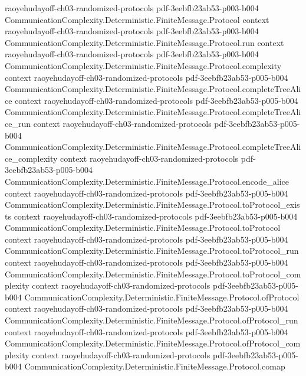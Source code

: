 \begin{theorem}
  {raoyehudayoff-ch03-randomized-protocols}
  {pdf-3eebfb23ab53-p003-b004}
\proofstep
  {CommunicationComplexity.Deterministic.FiniteMessage.Protocol}
  {context}
  {raoyehudayoff-ch03-randomized-protocols}
  {pdf-3eebfb23ab53-p003-b004}
\proofstep
  {CommunicationComplexity.Deterministic.FiniteMessage.Protocol.run}
  {context}
  {raoyehudayoff-ch03-randomized-protocols}
  {pdf-3eebfb23ab53-p003-b004}
\proofstep
  {CommunicationComplexity.Deterministic.FiniteMessage.Protocol.complexity}
  {context}
  {raoyehudayoff-ch03-randomized-protocols}
  {pdf-3eebfb23ab53-p005-b004}
\proofstep
  {CommunicationComplexity.Deterministic.FiniteMessage.Protocol.completeTreeAlice}
  {context}
  {raoyehudayoff-ch03-randomized-protocols}
  {pdf-3eebfb23ab53-p005-b004}
\proofstep
  {CommunicationComplexity.Deterministic.FiniteMessage.Protocol.completeTreeAlice_run}
  {context}
  {raoyehudayoff-ch03-randomized-protocols}
  {pdf-3eebfb23ab53-p005-b004}
\proofstep
  {CommunicationComplexity.Deterministic.FiniteMessage.Protocol.completeTreeAlice_complexity}
  {context}
  {raoyehudayoff-ch03-randomized-protocols}
  {pdf-3eebfb23ab53-p005-b004}
\proofstep
  {CommunicationComplexity.Deterministic.FiniteMessage.Protocol.encode_alice}
  {context}
  {raoyehudayoff-ch03-randomized-protocols}
  {pdf-3eebfb23ab53-p005-b004}
\proofstep
  {CommunicationComplexity.Deterministic.FiniteMessage.Protocol.toProtocol_exists}
  {context}
  {raoyehudayoff-ch03-randomized-protocols}
  {pdf-3eebfb23ab53-p005-b004}
\proofstep
  {CommunicationComplexity.Deterministic.FiniteMessage.Protocol.toProtocol}
  {context}
  {raoyehudayoff-ch03-randomized-protocols}
  {pdf-3eebfb23ab53-p005-b004}
\proofstep
  {CommunicationComplexity.Deterministic.FiniteMessage.Protocol.toProtocol_run}
  {context}
  {raoyehudayoff-ch03-randomized-protocols}
  {pdf-3eebfb23ab53-p005-b004}
\proofstep
  {CommunicationComplexity.Deterministic.FiniteMessage.Protocol.toProtocol_complexity}
  {context}
  {raoyehudayoff-ch03-randomized-protocols}
  {pdf-3eebfb23ab53-p005-b004}
\proofstep
  {CommunicationComplexity.Deterministic.FiniteMessage.Protocol.ofProtocol}
  {context}
  {raoyehudayoff-ch03-randomized-protocols}
  {pdf-3eebfb23ab53-p005-b004}
\proofstep
  {CommunicationComplexity.Deterministic.FiniteMessage.Protocol.ofProtocol_run}
  {context}
  {raoyehudayoff-ch03-randomized-protocols}
  {pdf-3eebfb23ab53-p005-b004}
\proofstep
  {CommunicationComplexity.Deterministic.FiniteMessage.Protocol.ofProtocol_complexity}
  {context}
  {raoyehudayoff-ch03-randomized-protocols}
  {pdf-3eebfb23ab53-p005-b004}
\proofstep
  {CommunicationComplexity.Deterministic.FiniteMessage.Protocol.comap}

\end{theorem}
